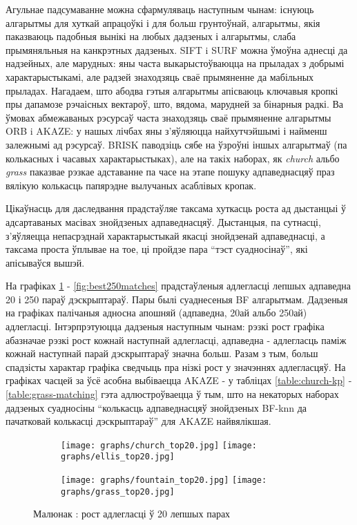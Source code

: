 Агульнае падсумаванне можна сфармуляваць наступным чынам: існуюць алгарытмы для хуткай апрацоўкі і для больш грунтоўнай,
алгарытмы, якія паказваюць падобныя вынікі на любых дадзеных і алгарытмы, слаба прымяняльныя на канкрэтных дадзеных.
SIFT i SURF можна ўмоўна аднесці да надзейных, але марудных: яны часта выкарыстоўваюцца на прыладах з добрымі характарыстыкамі,
але радзей знаходзяць сваё прымяненне да мабільных прыладах. Нагадаем, што абодва гэтыя алгарытмы апісваюць ключавыя кропкі
пры дапамозе рэчаісных вектароў, што, вядома, марудней за бінарныя радкі.
Ва ўмовах абмежаваных рэсурсаў часта знаходзяць сваё прымяненне
алгарытмы ORB i AKAZE: у нашых лічбах яны з'яўляюцца найхутчэйшымі і найменш залежнымі ад рэсурсаў.
BRISK паводзіць сябе на ўзроўні іншых алгарытмаў (па колькасных і часавых характарыстыках), але на такіх наборах, як
\textit{church} альбо \textit{grass} паказвае рэзкае адставанне па часе на этапе пошуку адпаведнасцяў праз вялікую колькасць
папярэдне вылучаных асаблівых кропак.

Цікаўнасць для даследвання прадстаўляе таксама хуткасць роста ад дыстанцыі ў адсартаваных масівах знойдзеных адпаведнасцяў.
Дыстанцыя, па сутнасці, з'яўляецца непасрэднай характарыстыкай якасці знойдзенай адпаведнасці, а таксама проста ўплывае на тое,
ці пройдзе пара ``тэст суадносінаў'', які апісываўся вышэй.

На графіках \ref{fig:best20matches} - \ref{fig:best250matches} прадстаўленыя адлегласці лепшых адпаведна 20 і 250 параў дэскрыптараў.
Пары былі суаднесеныя BF алгарытмам. Дадзеныя на графіках палічаныя адносна апошняй (адпаведна, 20ай альбо 250ай) адлегласці.
Інтэрпрэтуюцца дадзеныя наступным чынам: рэзкі рост графіка абазначае рэзкі рост кожнай наступнай адлегласці, адпаведна - адлегласць
паміж кожнай наступнай парай дэскрыптараў значна больш. Разам з тым, больш спадзісты характар графіка сведчыць пра нізкі рост
у значэннях адлегласцяў. На графіках часцей за ўсё асобна выбіваецца AKAZE - у табліцах \ref{table:church-kp} - \ref{table:grass-matching}
гэта адлюстроўваецца ў тым, што на некаторых наборах дадзеных суадносіны ``колькасць адпаведнасцяў знойдзеных BF-knn да пачатковай
колькасці дэскрыптараў'' для AKAZE найвялікшая.

\begin{figure}[h]
\centering
\begin{subfigure}{.5\textwidth}
  \centering
  \texttt{[image: graphs/church\_top20.jpg]}
  \texttt{[image: graphs/ellis\_top20.jpg]}
\end{subfigure}%
\begin{subfigure}{.5\textwidth}
  \centering
  \texttt{[image: graphs/fountain\_top20.jpg]}
  \texttt{[image: graphs/grass\_top20.jpg]}
\end{subfigure}%
\captionsetup{labelformat=empty,justification=centering}
\caption{Малюнак : рост адлегласці ў 20 лепшых парах}
\label{fig:best20matches}
\end{figure}

